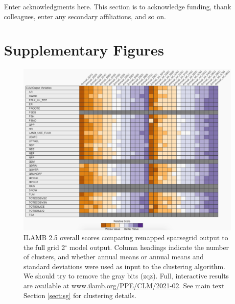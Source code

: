 \documentclass[draft]{agujournal2019}
\begin{document}
\acknowledgments
Enter acknowledgments here. This section is to acknowledge funding, thank colleagues, enter any secondary affiliations, and so on.






\appendix
\section{Supplementary Figures}


\begin{figure}[h]
\centering
\includegraphics[width=42pc]{../figs/supp/ilamb.pdf}
\caption{ILAMB 2.5 overall scores comparing remapped sparsegrid output to the full grid 2$^{\circ}$ model output. Column headings indicate the number of clusters, and whether annual means or annual means and standard deviations were used as input to the clustering algorithm. We should try to remove the gray bits (zqz). Full, interactive results are available at \url{www.ilamb.org/PPE/CLM/2021-02}. See main text Section \ref{sect:sg} for clustering details.}
\label{supp:ilamb}
\end{figure}
\end{document}
